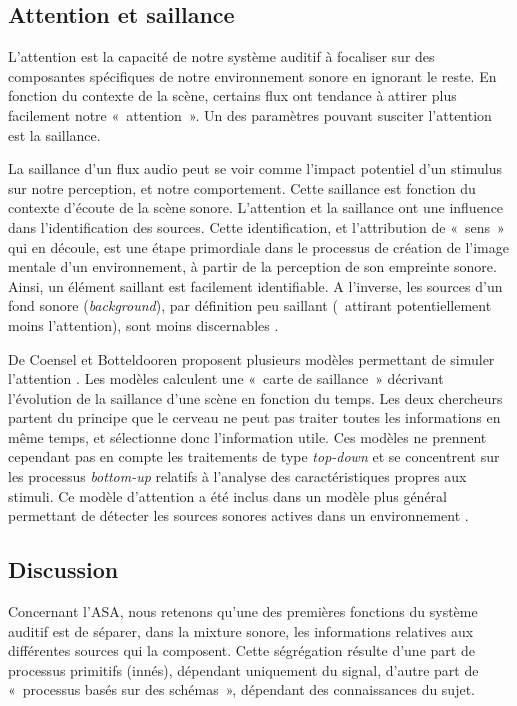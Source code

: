 \subsection{Attention et saillance}

L'attention est la capacité de notre système auditif à focaliser sur des composantes spécifiques de notre environnement sonore en ignorant le reste. En fonction du contexte de la scène, certains flux ont tendance à attirer plus facilement notre «~attention~». Un des paramètres pouvant susciter l’attention est la saillance.

La saillance d'un flux audio peut se voir comme l’impact potentiel d’un stimulus sur notre perception, et notre comportement. Cette saillance est fonction du contexte d'écoute de la scène sonore. L’attention et la saillance ont une influence dans l’identification des sources. Cette identification, et l'attribution de «~sens~» qui en découle, est une étape primordiale dans le processus de création de l’image mentale d’un environnement, à partir de la perception de son empreinte sonore. Ainsi, un élément saillant est facilement identifiable. A l'inverse, les sources d'un fond sonore (\emph{background}), par définition peu saillant (\ie~attirant potentiellement moins l’attention), sont moins discernables \citep{elhilali2009interaction}.

De Coensel et Botteldooren proposent plusieurs modèles permettant de simuler l’attention \citep{botteldooren2009role,de2010model,de2010application}. Les modèles calculent une «~carte de saillance~» décrivant l’évolution de la saillance d’une scène en fonction du temps. Les deux chercheurs partent du principe que le cerveau ne peut pas traiter toutes les informations en même temps, et sélectionne donc l'information utile. Ces modèles ne prennent cependant pas en compte les traitements de type \emph{top-down} et se concentrent sur les processus \emph{bottom-up} relatifs à l’analyse des caractéristiques propres aux stimuli. Ce modèle d'attention a été inclus dans un modèle plus général permettant de détecter les sources sonores actives dans un environnement \citep{oldoni2012computational,oldoni2013computational}. 

\subsection{Discussion}

Concernant l'ASA, nous retenons qu'une des premières fonctions du système auditif est de séparer, dans la mixture sonore, les informations relatives aux différentes sources qui la composent. Cette ségrégation résulte d'une part de processus primitifs (innés), dépendant uniquement du signal, d'autre part de «~processus basés sur des schémas~», dépendant des connaissances du sujet. 

